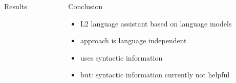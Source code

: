 \documentclass[final,t]{beamer}
\begin{document}
\begin{frame}{}
\begin{columns}
\begin{column}{.64\linewidth}
\begin{block}{Results}
\begin{center}
\end{center}
\end{block}

  \end{column}

  \begin{column}{.31\linewidth}

\begin{block}{Conclusion}

\begin{itemize}
\item L2 language assistant based on language models
\item approach is language independent
\item uses syntactic information
\item but: syntactic information currently not helpful 
\end{itemize}

\end{block}

  \end{column}
\end{columns}

\end{frame}
\end{document}
